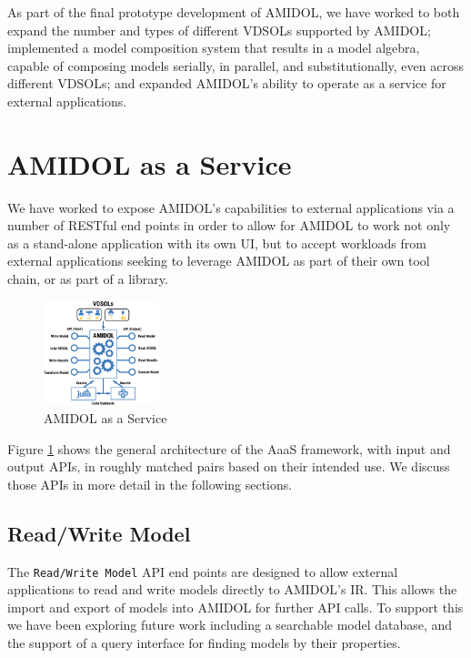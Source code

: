 \documentclass[12pt]{galois-whitepaper}
\begin{document}
As part of the final prototype development of AMIDOL, we have worked
to both expand the number and types of different VDSOLs supported by
AMIDOL; implemented a model composition system that results in a model
algebra, capable of composing models serially, in parallel, and
substitutionally, even across different VDSOLs; and expanded AMIDOL's
ability to operate as a service for external applications.

\section{AMIDOL as a Service}

We have worked to expose AMIDOL's capabilities to external
applications via a number of RESTful end points in order to allow for
AMIDOL to work not only as a stand-alone application with its own UI,
but to accept workloads from external applications seeking to leverage
AMIDOL as part of their own tool chain, or as part of a library.

\begin{figure}
  \centering
  \includegraphics[width=0.3\textwidth]{figs/AMIDOL-service.png}
  \caption{AMIDOL as a Service}
  \label{Fig:Service}
\end{figure}

Figure \ref{Fig:Service} shows the general architecture of the AaaS
framework, with input and output APIs, in roughly matched pairs based
on their intended use.  We discuss those APIs in more
detail in the following sections.

\subsection{Read/Write Model}

The \texttt{Read/Write Model} API end points are designed to allow
external applications to read and write models directly to AMIDOL's
IR.  This allows the import and export of models into AMIDOL for
further API calls.  To support this we have been exploring future work
including a searchable model database, and the support of a query
interface for finding models by their properties.
\end{document}
